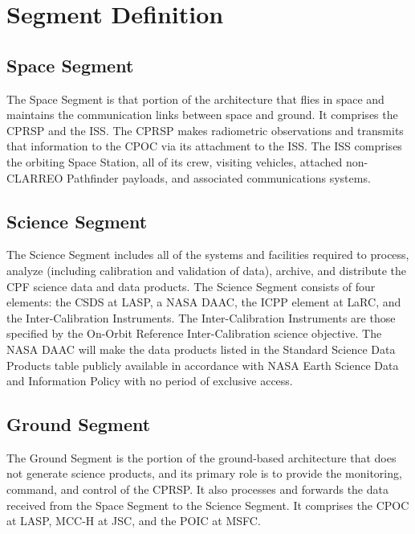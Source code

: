 \section{Segment Definition }
\label{segmentdefinition}

\subsection{Space Segment }
\label{spacesegment}

The Space Segment is that portion of the architecture that flies in space and maintains the communication links between space and ground. It comprises the \gls{CPRSP} and the \gls{ISS}. The \gls{CPRSP} makes radiometric observations and transmits that information to the \gls{CPOC} via its attachment to the \gls{ISS}. The \gls{ISS} comprises the orbiting Space Station, all of its crew, visiting vehicles, attached non-\gls{CLARREO} Pathfinder payloads, and associated communications systems.

\subsection{Science Segment }
\label{sciencesegment}

The Science Segment includes all of the systems and facilities required to process, analyze (including calibration and validation of data), archive, and distribute the \gls{CPF} science data and data products. The Science Segment consists of four elements: the \gls{CSDS} at \gls{LASP}, a NASA \gls{DAAC}, the \gls{ICPP} element at \gls{LaRC}, and the Inter-Calibration Instruments. The Inter-Calibration Instruments are those specified by the On-Orbit Reference Inter-Calibration science objective. The NASA \gls{DAAC} will make the data products listed in the Standard Science Data Products table publicly available in accordance with NASA Earth Science Data and Information Policy with no period of exclusive access.

\subsection{Ground Segment }
\label{groundsegment}

The Ground Segment is the portion of the ground-based architecture that does not generate science products, and its primary role is to provide the monitoring, command, and control of the \gls{CPRSP}. It also processes and forwards the data received from the Space Segment to the Science Segment. It comprises the \gls{CPOC} at \gls{LASP}, \gls{MCC-H} at \gls{JSC}, and the \gls{POIC} at \gls{MSFC}.

